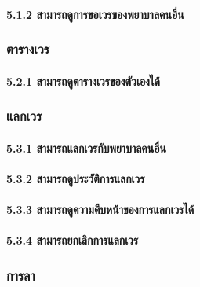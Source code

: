 \hspace{2.5cm}\paragraph{5.1.2 สามารถดูการขอเวรของพยาบาลคนอื่น}

\hspace{1cm}\subsubsection{ตารางเวร}

\hspace{2.5cm}\paragraph{5.2.1 สามารถดูตารางเวรของตัวเองได้}

\hspace{1cm}\subsubsection{แลกเวร}

\hspace{2.5cm}\paragraph{5.3.1 สามารถแลกเวรกับพยาบาลคนอื่น}

\hspace{2.5cm}\paragraph{5.3.2 สามารถดูประวัติการแลกเวร}

\hspace{2.5cm}\paragraph{5.3.3 สามารถดูความคืบหน้าของการแลกเวรได้}

\hspace{2.5cm}\paragraph{5.3.4 สามารถยกเลิกการแลกเวร}

\hspace{1cm}\subsubsection{การลา}

